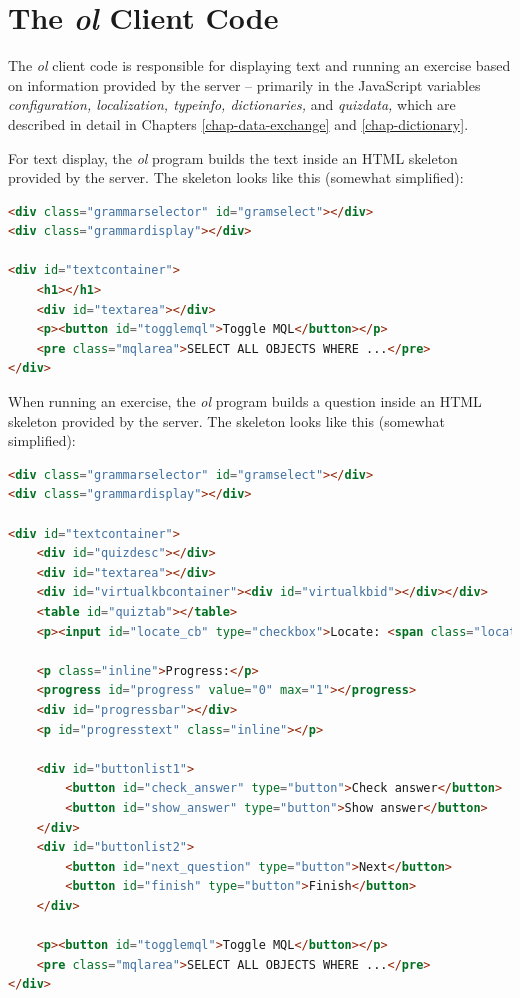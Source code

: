 \documentclass[11pt,oneside,a4paper]{memoir}
\begin{document}
\section{The \emph{ol} Client Code}\label{sec-ol}

The \emph{ol} client code is responsible for displaying text and running an exercise based on
information provided by the server -- primarily in the JavaScript variables \emph{configuration,
  localization, typeinfo, dictionaries,} and \emph{quizdata,} which are described in detail in
Chapters \ref{chap-data-exchange} and \ref{chap-dictionary}.

For text display, the \emph{ol} program builds the text inside an HTML skeleton provided by the
server. The skeleton looks like this (somewhat simplified):


\begin{lstlisting}[language=HTML]
<div class="grammarselector" id="gramselect"></div>
<div class="grammardisplay"></div>

<div id="textcontainer">
    <h1></h1>
    <div id="textarea"></div>
    <p><button id="togglemql">Toggle MQL</button></p>
    <pre class="mqlarea">SELECT ALL OBJECTS WHERE ...</pre>
</div>
\end{lstlisting}

When running an exercise, the \emph{ol} program builds a question inside an HTML skeleton provided by the
server. The skeleton looks like this (somewhat simplified):

\begin{lstlisting}[language=HTML,morekeywords={progress}]
<div class="grammarselector" id="gramselect"></div>
<div class="grammardisplay"></div>
 
<div id="textcontainer">
    <div id="quizdesc"></div>
    <div id="textarea"></div>
    <div id="virtualkbcontainer"><div id="virtualkbid"></div></div>
    <table id="quiztab"></table>
    <p><input id="locate_cb" type="checkbox">Locate: <span class="location"></span></p>

    <p class="inline">Progress:</p>
    <progress id="progress" value="0" max="1"></progress>
    <div id="progressbar"></div>
    <p id="progresstext" class="inline"></p>

    <div id="buttonlist1">
        <button id="check_answer" type="button">Check answer</button>
        <button id="show_answer" type="button">Show answer</button>
    </div>
    <div id="buttonlist2">
        <button id="next_question" type="button">Next</button>
        <button id="finish" type="button">Finish</button>
    </div>

    <p><button id="togglemql">Toggle MQL</button></p>
    <pre class="mqlarea">SELECT ALL OBJECTS WHERE ...</pre>
</div>
\end{lstlisting}
  
\end{document}
